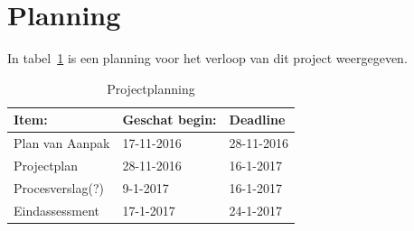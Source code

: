 \documentclass[numbers=endperiod]{scrartcl}
\begin{document}
	\section{Planning}
	In tabel~\ref{table:Planning} is een planning voor het verloop van dit project weergegeven.
	\begin{table}[h]
	\caption{Projectplanning}\label{table:Planning}
	\centering
	\begin{tabular}{| p{} | p{} | p{} |}
			\hline \rowcolor{hhs_theme_heading_2}
			Item: 				& Geschat begin:& Deadline \\ \hline
			Plan van Aanpak 	& 17-11-2016 	& 28-11-2016 \\ \hline
			Projectplan		 	& 28-11-2016	& 16-1-2017 \\ \hline
			Procesverslag(?)	& 9-1-2017		& 16-1-2017 \\ \hline
			Eindassessment		& 17-1-2017		& 24-1-2017 \\ \hline
		\end{tabular}
	\end{table}
	\newpage

	
	
	
\end{document}
